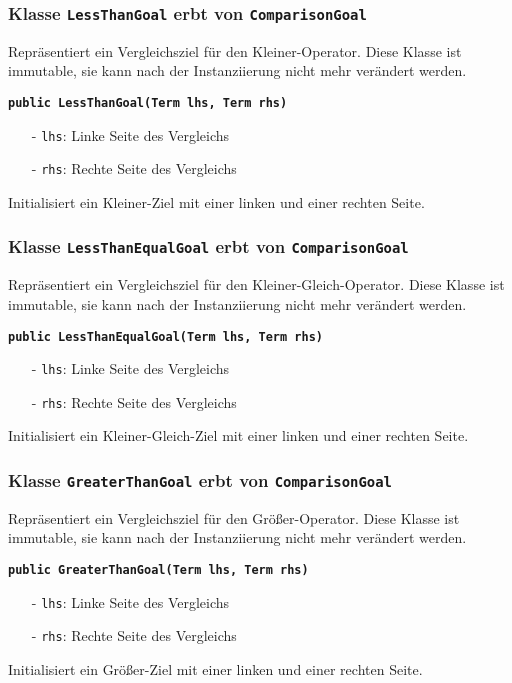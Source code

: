 \documentclass[parskip=full,11pt,twoside]{scrartcl}
\begin{document}
\subsubsection{Klasse \texttt{LessThanGoal} erbt von \texttt{ComparisonGoal}}
Repräsentiert ein Vergleichsziel für den Kleiner-Operator. Diese Klasse ist immutable, sie kann nach der Instanziierung nicht mehr verändert werden.

\textbf{\texttt{public LessThanGoal(Term lhs, Term rhs)}}
\begin{itemize}[noitemsep]
	\item[-] \texttt{lhs}: Linke Seite des Vergleichs 
	\item[-] \texttt{rhs}: Rechte Seite des Vergleichs
\end{itemize}
Initialisiert ein Kleiner-Ziel mit einer linken und einer rechten Seite.

\subsubsection{Klasse \texttt{LessThanEqualGoal} erbt von \texttt{ComparisonGoal}}
Repräsentiert ein Vergleichsziel für den Kleiner-Gleich-Operator. Diese Klasse ist immutable, sie kann nach der Instanziierung nicht mehr verändert werden.

\textbf{\texttt{public LessThanEqualGoal(Term lhs, Term rhs)}}
\begin{itemize}[noitemsep]
	\item[-] \texttt{lhs}: Linke Seite des Vergleichs
	\item[-] \texttt{rhs}: Rechte Seite des Vergleichs
\end{itemize}
Initialisiert ein Kleiner-Gleich-Ziel mit einer linken und einer rechten Seite.

\subsubsection{Klasse \texttt{GreaterThanGoal} erbt von \texttt{ComparisonGoal}}
Repräsentiert ein Vergleichsziel für den Größer-Operator. Diese Klasse ist immutable, sie kann nach der Instanziierung nicht mehr verändert werden.

\textbf{\texttt{public GreaterThanGoal(Term lhs, Term rhs)}}
\begin{itemize}[noitemsep]
	\item[-] \texttt{lhs}: Linke Seite des Vergleichs
	\item[-] \texttt{rhs}: Rechte Seite des Vergleichs
\end{itemize}
Initialisiert ein Größer-Ziel mit einer linken und einer rechten Seite.
\end{document}
